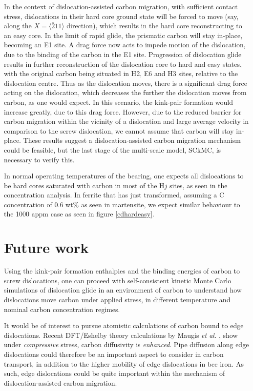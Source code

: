 \documentclass[a4paper,11pt]{article}
\begin{document}
In the context of dislocation-assisted carbon migration, with sufficient contact
stress, dislocations in their hard core ground state will be forced to move (say,
along the \(X = \langle\bar{2}11\rangle\) direction), which results in the hard core
reconstructing to an easy core. In the limit of rapid glide, the prismatic carbon will
stay in-place, becoming an E1 site. A drag force now acts to impede motion of the
dislocation, due to the binding of the carbon in the E1 site. Progression of
dislocation glide results in further reconstruction of the dislocation core to hard
and easy states, with the original carbon being situated in H2, E6 and H3 sites,
relative to the dislocation centre. Thus as the dislocation moves, there is a
significant drag force acting on the dislocation, which decreases the further the
dislocation moves from carbon, as one would expect. In this scenario, the kink-pair
formation would increase greatly, due to this drag force. However, due to the reduced
barrier for carbon migration within the vicinity of a dislocation and large average
velocity in comparison to the screw dislocation, we cannot assume that carbon will
stay in-place. These results suggest a dislocation-assisted carbon migration mechanism could be
feasible, but the last stage of the multi-scale model, SCkMC, is necessary to verify
this.



In normal operating temperatures of the bearing, one expects all dislocations to be hard cores
saturated with carbon in most of the \(\text{H}j\) sites, as seen in
the concentration analysis. In ferrite that has just transformed, assuming a C concentration of
0.6 wt\% as seen in martensite, we expect similar behaviour to the 1000 appm case as seen in
figure \ref{cdhardeasy}.



\section{Future work}
\label{sec:org251ac89}

Using the kink-pair formation enthalpies and the binding energies of carbon to screw dislocations, one can proceed
with self-consistent kinetic Monte Carlo simulations of dislocation glide in an environment of carbon to
understand how dislocations move carbon under applied stress, in different temperature
and nominal carbon concentration regimes.


It would be of interest to pursue atomistic calculations of carbon bound to edge
dislocations. Recent DFT/Eshelby theory calculations by Maugis \emph{et al.} \cite{Maugis2020}, show
under \emph{compressive} stress, carbon diffusivity is \emph{enhanced}. Pipe diffusion along edge
dislocations could therefore be an important aspect to consider in carbon transport, in addition
to the higher mobility of edge dislocations in bcc iron. As such, edge dislocations could be quite
important within the mechanism of dislocation-assisted carbon migration.
\end{document}
